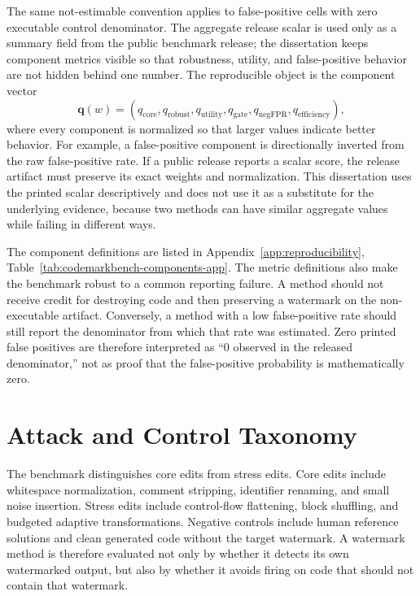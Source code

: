 The same not-estimable convention applies to false-positive cells with zero executable control denominator.
The aggregate release scalar is used only as a summary field from the public benchmark release; the dissertation keeps component metrics visible so that robustness, utility, and false-positive behavior are not hidden behind one number. The reproducible object is the component vector
\begin{equation}
  \mathbf{q}(w) = (q_{\mathrm{core}},q_{\mathrm{robust}},q_{\mathrm{utility}},q_{\mathrm{gate}},q_{\mathrm{negFPR}},q_{\mathrm{efficiency}}),
\end{equation}
where every component is normalized so that larger values indicate better behavior. For example, a false-positive component is directionally inverted from the raw false-positive rate. If a public release reports a scalar score, the release artifact must preserve its exact weights and normalization. This dissertation uses the printed scalar descriptively and does not use it as a substitute for the underlying evidence, because two methods can have similar aggregate values while failing in different ways.

The component definitions are listed in Appendix~\ref{app:reproducibility}, Table~\ref{tab:codemarkbench-components-app}. The metric definitions also make the benchmark robust to a common reporting failure. A method should not receive credit for destroying code and then preserving a watermark on the non-executable artifact. Conversely, a method with a low false-positive rate should still report the denominator from which that rate was estimated. Zero printed false positives are therefore interpreted as ``0 observed in the released denominator,'' not as proof that the false-positive probability is mathematically zero.

\section{Attack and Control Taxonomy}

The benchmark distinguishes core edits from stress edits. Core edits include whitespace normalization, comment stripping, identifier renaming, and small noise insertion. Stress edits include control-flow flattening, block shuffling, and budgeted adaptive transformations. Negative controls include human reference solutions and clean generated code without the target watermark. A watermark method is therefore evaluated not only by whether it detects its own watermarked output, but also by whether it avoids firing on code that should not contain that watermark.

